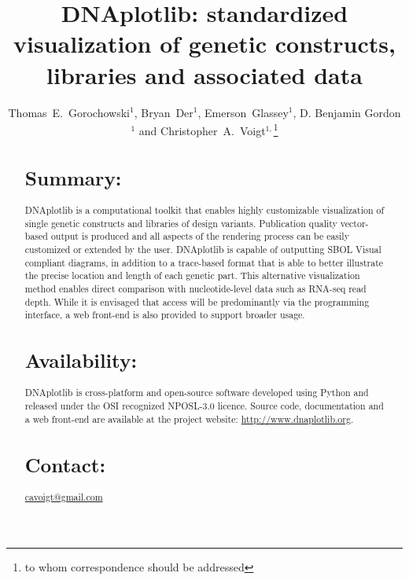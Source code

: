 \documentclass{bioinfo}
\begin{document}

\title[DNAplotlib]{DNAplotlib: standardized visualization of genetic constructs, libraries and associated data}
\author[Thomas E. Gorochowski \textit{et~al.}]{Thomas~E.~Gorochowski$^{1}$, Bryan~Der$^{1}$, Emerson~Glassey$^{1}$, D. Benjamin Gordon$^{1}$ and Christopher~A.~Voigt$^{1,}$\footnote{to whom correspondence should be addressed}}
\address{$^{1}$Department of Biological Engineering, Synthetic Biology Center, Massachusetts Institute of Technology, USA.}



\maketitle

\begin{abstract}

\section{Summary:}
DNAplotlib is a computational toolkit that enables highly customizable visualization of single genetic constructs and libraries of design variants. Publication quality vector-based output is produced and all aspects of the rendering process can be easily customized or extended by the user. DNAplotlib is capable of outputting SBOL Visual compliant diagrams, in addition to a trace-based format that is able to better illustrate the precise location and length of each genetic part. This alternative visualization method enables direct comparison with nucleotide-level data such as RNA-seq read depth. While it is envisaged that access will be predominantly via the programming interface, a web front-end is also provided to support broader usage.

\section{Availability:}
DNAplotlib is cross-platform and open-source software developed using Python and released under the OSI recognized NPOSL-3.0 licence. Source code, documentation and a web front-end are available at the project website: \href{http://www.dnaplotlib.org}{http://www.dnaplotlib.org}.

\section{Contact:} \href{cavoigt@gmail.com}{cavoigt@gmail.com}
\end{abstract}
\end{document}
